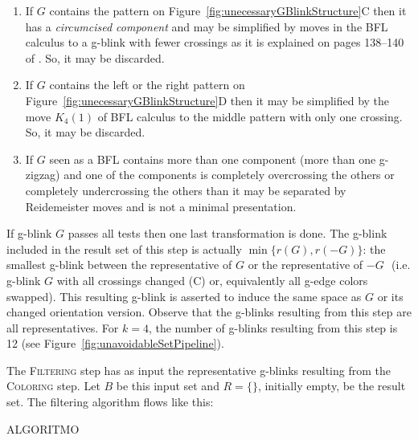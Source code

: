 \begin{enumerate}
\item If $G$ contains the pattern on
Figure~\ref{fig:unecessaryGBlinkStructure}C then it has a {\em
circumcised component} and may be simplified by moves in the BFL
calculus to a g-blink with fewer crossings as it is explained on
pages 138--140 of \cite{KauffmanAndLins1994}. So, it may be discarded.

\item If $G$ contains the left or the right pattern on
Figure~\ref{fig:unecessaryGBlinkStructure}D then it may be simplified
by the move $K_4(1)$ of BFL calculus to the middle pattern with only
one crossing. So, it may be discarded.

\item If $G$ seen as a BFL contains more than one
component (more than one g-zigzag) and one of the components is completely
overcrossing the others or completely undercrossing the others than it may
be separated by Reidemeister moves and is not a minimal presentation.
\end{enumerate}
If g-blink $G$ passes all tests then one last transformation is done.
The g-blink included in the result set of this step is
actually $\min\{r(G), r(-G)\}$: the smallest g-blink
between the representative of $G$ or the representative of $-G$
\,\,(i.e. g-blink $G$ with all crossings changed (C) or, equivalently
all g-edge colors swapped). This resulting g-blink is asserted to
induce the same space as $G$ or its changed orientation version. Observe
that the g-blinks resulting from this step are all representatives.  For $k=4$,
the number of g-blinks resulting from this step is 12 (see
Figure~\ref{fig:unavoidableSetPipeline}).

The \textsc{Filtering} step has as input the representative
g-blinks resulting from the \textsc{Coloring} step. Let $B$ be this
input set and $R = \{\}$, initially empty, be the result set.
The filtering algorithm flows like this:


\begin{center}
 ALGORITMO
\end{center}

